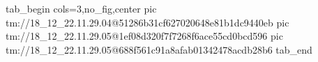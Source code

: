  
 
 
 
 

\qqSecOrig


\ifcmt
  tab_begin cols=3,no_fig,center
    pic tm://18_12_22.11.29.04@51286b31cf627020648e81b1dc9440eb
    pic tm://18_12_22.11.29.05@1ef08d320f7f7268f6ace55cd0bcd596
    pic tm://18_12_22.11.29.05@688f561c91a8afab01342478acdb28b6
  tab_end
\fi

